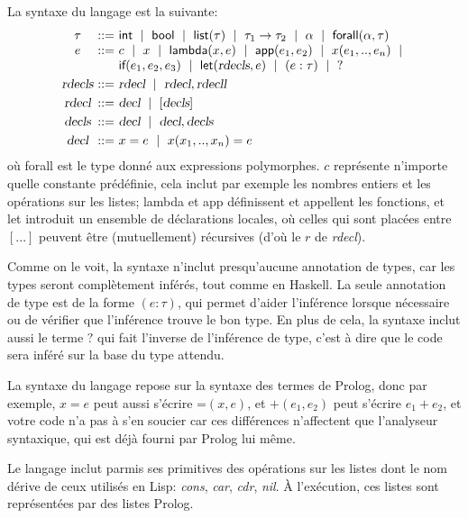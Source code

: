\documentclass{article}
\makeatletter
\newcommand \kw [1] {\textsf{#1}}
\newcommand \id [1] {\textsl{#1}}
\newcommand \Align [2][t] {\begin{array}[#1]{@{}l@{}} #2 \end{array}}
\newcommand \MAlign \Align
\renewcommand \: {\!:\!}
\makeatother
\begin{document}
La syntaxe du langage est la suivante:
\begin{displaymath}
  \begin{array}{c@{~::=~}l}
    \tau & \kw{int} ~\mid~ \kw{bool} ~\mid~ \kw{list}(\tau)
    ~\mid~ \tau_1 \to \tau_2 ~\mid~ \alpha ~\mid~ \kw{forall}(\alpha,\tau) \\
    e & \MAlign{
      c ~\mid~ x ~\mid~ \kw{lambda}(x,e) ~\mid~ \kw{app}(e_1,e_2)
      ~\mid~ x(e_1,..,e_n) ~\mid~ \\
      \kw{if}(e_1,e_2,e_3) ~\mid~ \kw{let}(\id{rdecls},e) ~\mid~(e : \tau)~\mid~ {?}
    } \smallskip \\
    \id{rdecls} & \id{rdecl} ~\mid~ \id{rdecl}, \id{rdecll}  \smallskip\\
    \id{rdecl} & \id{decl} ~\mid~ [ \id{decls} ] \smallskip\\
    \id{decls} & \id{decl} ~\mid~ \id{decl}, \id{decls}  \smallskip\\
    \id{decl} & x = e ~\mid~ x(x_1,..,x_n) = e
  \end{array}
\end{displaymath}
où \kw{forall} est le type donné aux expressions polymorphes.
$c$ représente n'importe quelle constante prédéfinie, cela inclut par
exemple les nombres entiers et les opérations sur les listes; \kw{lambda} et
\kw{app} définissent et appellent les fonctions, et \kw{let} introduit un
ensemble de déclarations locales, où celles qui sont placées entre $[...]$
peuvent être (mutuellement) récursives (d'où le $r$ de \id{rdecl}).

Comme on le voit, la syntaxe n'inclut presqu'aucune annotation de types, car
les types seront complètement inférés, tout comme en Haskell.  La seule
annotation de type est de la forme $(e : \tau)$, qui permet d'aider l'inférence
lorsque nécessaire ou de vérifier que l'inférence trouve le bon type.
En plus de cela, la syntaxe inclut aussi le terme $?$ qui fait l'inverse
de l'inférence de type, c'est à dire que le code sera inféré sur la base du
type attendu.

La syntaxe du langage repose sur la syntaxe des termes de Prolog, donc par
exemple, $x = e$ peut aussi s'écrire $\kw{=}(x,e)$, et $+(e_1,e_2)$ peut
s'écrire $e_1 + e_2$, et votre code n'a pas à s'en soucier car ces
différences n'affectent que l'analyseur syntaxique, qui est déjà fourni
par Prolog lui même.

Le langage inclut parmis ses primitives des opérations sur les listes dont
le nom dérive de ceux utilisés en Lisp: \id{cons}, \id{car}, \id{cdr},
\id{nil}.  À l'exécution, ces listes sont représentées par des
listes Prolog.
\end{document}
